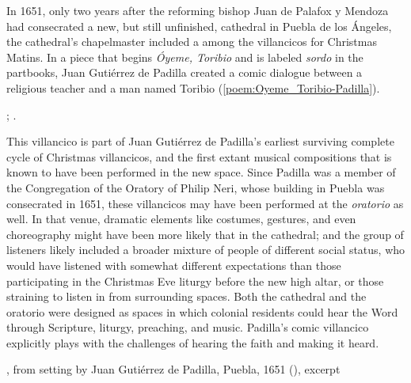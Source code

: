 In 1651, only two years after the reforming bishop Juan de Palafox y Mendoza had
consecrated a new, but still unfinished, cathedral in Puebla de los Ángeles, the
cathedral's chapelmaster included a  among the
villancicos for Christmas Matins.
In a piece that begins \emph{Óyeme, Toribio} and is labeled \emph{sordo} in the
partbooks, Juan Gutiérrez de Padilla created a comic dialogue between a
religious teacher and a  man named Toribio
(\cref{poem:Oyeme_Toribio-Padilla}).%
\begin{Footnote}
    ; \Autocites{Stanford:Catalog}{Puebla:Microfilm}.
\end{Footnote}
This villancico is part of Juan Gutiérrez de Padilla's earliest surviving
complete cycle of Christmas villancicos, and the first extant musical
compositions that is known to have been performed in the new space.%
    \Autocites{Cashner:Cards}{Mauleon:PadillaPalafox}
Since Padilla was a member of the Congregation of the Oratory of Philip Neri,
whose building in Puebla was consecrated in 1651, these villancicos may have
been performed at the \emph{oratorio} as well.
In that venue, dramatic elements like costumes, gestures, and even choreography
might have been more likely that in the cathedral; and the group of listeners
likely included a broader mixture of people of different social status, who
would have listened with somewhat different expectations than those
participating in the Christmas Eve liturgy before the new high altar, or those
straining to listen in from surrounding spaces.
Both the cathedral and the oratorio were designed as spaces in which colonial
residents could hear the Word through Scripture, liturgy, preaching, and music.
Padilla's comic  villancico explicitly plays with the challenges of
hearing the faith and making it heard.

\begin{poemexample}
    \caption{, from setting by Juan Gutiérrez
    de Padilla, Puebla, 1651 (), excerpt}

    \label{poem:Oyeme_Toribio-Padilla}

\end{poemexample}

